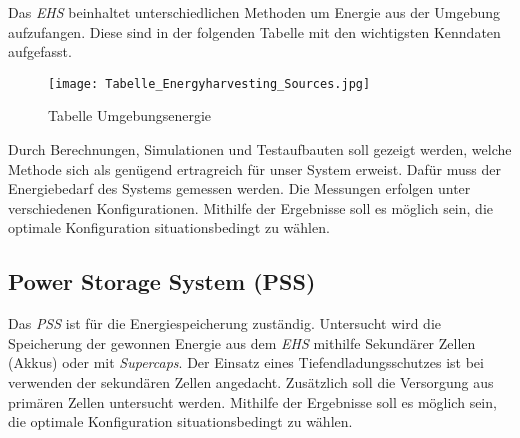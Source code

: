 Das \textit{EHS} beinhaltet unterschiedlichen Methoden um Energie aus der Umgebung aufzufangen. Diese sind in der folgenden Tabelle mit den wichtigsten Kenndaten aufgefasst. 

\begin{figure}[h]
	\centering
	\texttt{[image: Tabelle\_Energyharvesting\_Sources.jpg]}
	\caption{Tabelle Umgebungsenergie \cite{tran_rf_2017}}
	\label{img:Tabelle_Energyharvesting_Sources}
\end{figure} 

Durch Berechnungen, Simulationen und Testaufbauten soll gezeigt werden, welche Methode sich als genügend ertragreich für unser System erweist. Dafür muss der Energiebedarf des Systems gemessen werden. Die Messungen erfolgen unter verschiedenen Konfigurationen. Mithilfe der Ergebnisse soll es möglich sein, die optimale Konfiguration situationsbedingt zu wählen.



\subsection{Power Storage System (PSS)}\label{subsec:PSS}
Das \textit{PSS} ist für die Energiespeicherung zuständig. Untersucht wird die Speicherung der gewonnen Energie aus dem \textit{EHS} mithilfe Sekundärer Zellen (Akkus) oder mit \textit{Supercaps}. Der Einsatz eines Tiefendladungsschutzes ist bei verwenden der sekundären Zellen angedacht. Zusätzlich soll die Versorgung aus primären Zellen untersucht werden. Mithilfe der Ergebnisse soll es möglich sein, die optimale Konfiguration situationsbedingt zu wählen.   

 

